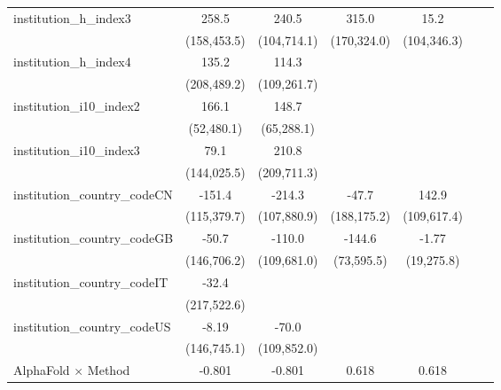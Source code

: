\begin{tabular}{lcccccc}
   institution\_h\_index3             & 258.5        & 240.5         & 315.0       & 15.2        &     &   \\   
                                      & (158,453.5)  & (104,714.1)   & (170,324.0) & (104,346.3) &     &   \\   
   institution\_h\_index4             & 135.2        & 114.3         &             &             &     &   \\   
                                      & (208,489.2)  & (109,261.7)   &             &             &     &   \\   
   institution\_i10\_index2           & 166.1        & 148.7         &             &             &     &   \\   
                                      & (52,480.1)   & (65,288.1)    &             &             &     &   \\   
   institution\_i10\_index3           & 79.1         & 210.8         &             &             &     &   \\   
                                      & (144,025.5)  & (209,711.3)   &             &             &     &   \\   
   institution\_country\_codeCN       & -151.4       & -214.3        & -47.7       & 142.9       &     &   \\   
                                      & (115,379.7)  & (107,880.9)   & (188,175.2) & (109,617.4) &     &   \\   
   institution\_country\_codeGB       & -50.7        & -110.0        & -144.6      & -1.77       &     &   \\   
                                      & (146,706.2)  & (109,681.0)   & (73,595.5)  & (19,275.8)  &     &   \\   
   institution\_country\_codeIT       & -32.4        &               &             &             &     &   \\   
                                      & (217,522.6)  &               &             &             &     &   \\   
   institution\_country\_codeUS       & -8.19        & -70.0         &             &             &     &   \\   
                                      & (146,745.1)  & (109,852.0)   &             &             &     &   \\   
   AlphaFold $\times$ Method          & -0.801       & -0.801        & 0.618       & 0.618       &     &   \\   

\end{tabular}
